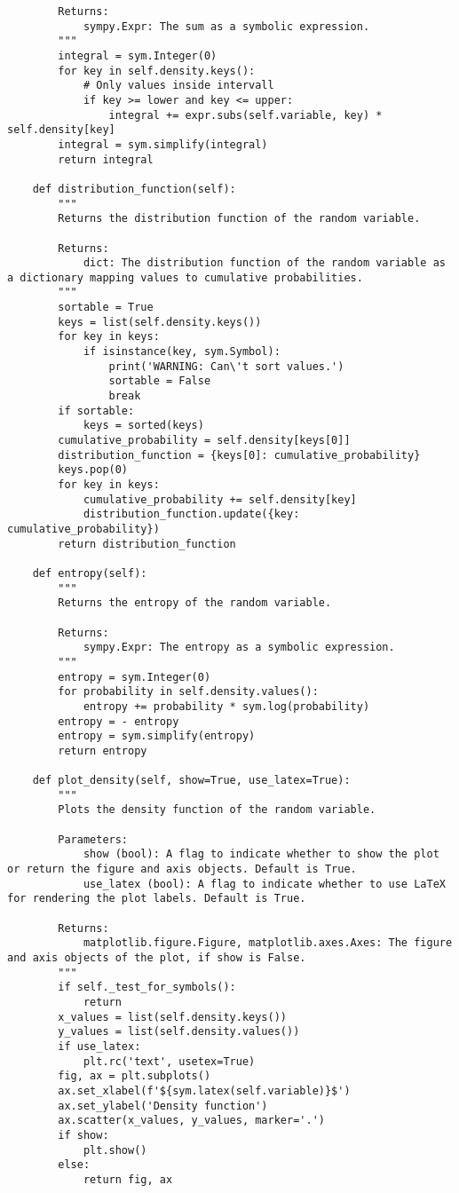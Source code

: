 \begin{small}
\begin{lstlisting}
        Returns:
            sympy.Expr: The sum as a symbolic expression.
        """
        integral = sym.Integer(0)
        for key in self.density.keys():
            # Only values inside intervall
            if key >= lower and key <= upper:
                integral += expr.subs(self.variable, key) * self.density[key]
        integral = sym.simplify(integral)
        return integral

    def distribution_function(self):
        """
        Returns the distribution function of the random variable.

        Returns:
            dict: The distribution function of the random variable as a dictionary mapping values to cumulative probabilities.
        """
        sortable = True
        keys = list(self.density.keys())
        for key in keys:
            if isinstance(key, sym.Symbol):
                print('WARNING: Can\'t sort values.')
                sortable = False
                break
        if sortable:
            keys = sorted(keys)
        cumulative_probability = self.density[keys[0]]
        distribution_function = {keys[0]: cumulative_probability}
        keys.pop(0)
        for key in keys:
            cumulative_probability += self.density[key]
            distribution_function.update({key: cumulative_probability})
        return distribution_function

    def entropy(self):
        """
        Returns the entropy of the random variable.

        Returns:
            sympy.Expr: The entropy as a symbolic expression.
        """
        entropy = sym.Integer(0)
        for probability in self.density.values():
            entropy += probability * sym.log(probability)
        entropy = - entropy
        entropy = sym.simplify(entropy)
        return entropy

    def plot_density(self, show=True, use_latex=True):
        """
        Plots the density function of the random variable.

        Parameters:
            show (bool): A flag to indicate whether to show the plot or return the figure and axis objects. Default is True.
            use_latex (bool): A flag to indicate whether to use LaTeX for rendering the plot labels. Default is True.

        Returns:
            matplotlib.figure.Figure, matplotlib.axes.Axes: The figure and axis objects of the plot, if show is False.
        """
        if self._test_for_symbols():
            return
        x_values = list(self.density.keys())
        y_values = list(self.density.values())
        if use_latex:
            plt.rc('text', usetex=True)
        fig, ax = plt.subplots()
        ax.set_xlabel(f'${sym.latex(self.variable)}$')
        ax.set_ylabel('Density function')
        ax.scatter(x_values, y_values, marker='.')
        if show:
            plt.show()
        else:
            return fig, ax


\end{lstlisting}
\end{small}
